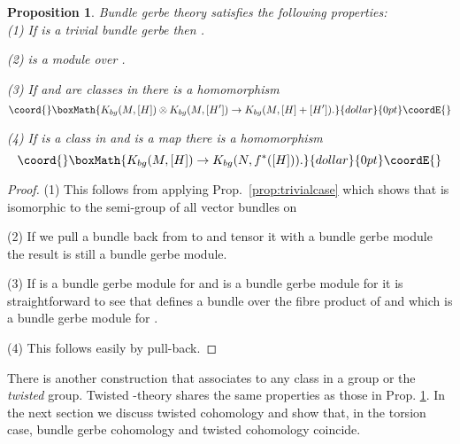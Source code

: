 \documentclass[a4paper,reqno]{amsart}
\DeclareMathOperator{\Mod}{Mod}
\theoremstyle{plain}
\newtheorem{proposition}[theorem]{Proposition}
\theoremstyle{definition}
\theoremstyle{remark}
\numberwithin{equation}{section}
\numberwithin{figure}{section}
\providecommand{\ZZ}{{\mathbb Z}}
\providecommand{\<}{\langle}
\renewcommand{\>}{\rangle}
\begin{document}
\begin{proposition}
\label{prop:bgkprops}
Bundle gerbe \coordHE{} theory satisfies the following properties:\\

(1) If \coordHE{} is a trivial bundle gerbe then \coordHE{}.

(2) \coordHE{} is a module over \coordHE{}.

(3)  If \myHighlight{$[H]$}\coordHE{} and \myHighlight{$[H']$}\coordHE{} are classes in \myHighlight{$H^3(M, \ZZ)$}\coordHE{} there is a homomorphism
$$\coord{}\boxMath{
K_{bg}(M, [H]) \otimes K_{bg}(M, [H']) \to K_{bg}(M, [H] + [H']).
}{dollar}{0pt}\coordE{}$$

(4) If \myHighlight{$[H]$}\coordHE{} is a class in \myHighlight{$H^3(M, \ZZ)$}\coordHE{} and \coordHE{} is a
map  there is a homomorphism
$$\coord{}\boxMath{
K_{bg}(M, [H]) \to K_{bg}(N, f^*([H])).
}{dollar}{0pt}\coordE{}$$

\end{proposition}
\begin{proof}
(1)   This follows from applying
Prop.~\ref{prop:trivialcase} which shows that
\myHighlight{$\Mod(L)$}\coordHE{} is isomorphic to the
semi-group of all vector bundles on \coordHE{}

(2) If we pull a bundle back from \coordHE{} to \coordHE{} and tensor it with a bundle
gerbe module the result is still a bundle gerbe module.

(3) If \coordHE{} is a bundle gerbe module for \coordHE{} and \coordHE{}
is a bundle gerbe module for \coordHE{} it is straightforward to see that
\coordHE{} defines a bundle over the fibre product of \coordHE{} and \coordHE{}
which is a bundle gerbe module for \coordHE{}.

(4) This follows easily by pull-back.

\end{proof}




There is another  construction that associates to any class
\myHighlight{$[H]$}\coordHE{} in  \myHighlight{$H^3(M, \ZZ)$}\coordHE{} a group \coordHE{} or the  {\em twisted}
\coordHE{} group. Twisted
\coordHE{}-theory shares the same properties as those in Prop. \ref{prop:bgkprops}.
In the next section  we discuss twisted cohomology and show that,
in the torsion case, bundle gerbe cohomology and twisted cohomology
coincide.
\end{document}
